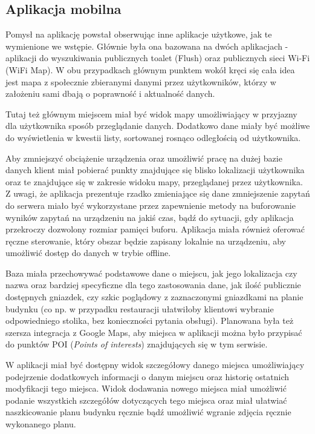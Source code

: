 \documentclass[polish,polish,a4paper,12pt]{article}
\begin{document}
	\subsection{Aplikacja mobilna}

	Pomysł na aplikację powstał obserwując inne aplikacje użytkowe, jak te wymienione we wstępie. Głównie była ona bazowana na dwóch aplikacjach - aplikacji do wyszukiwania publicznych toalet (Flush) oraz publicznych sieci Wi-Fi (WiFi Map). W obu przypadkach głównym punktem wokół kręci się cała idea jest mapa z społecznie zbieranymi danymi przez użytkowników, którzy w założeniu sami dbają o poprawność i aktualność danych.

	Tutaj też głównym miejscem miał być widok mapy umożliwiający w przyjazny dla użytkownika sposób przeglądanie danych. Dodatkowo dane miały być możliwe do wyświetlenia w kwestii listy, sortowanej rosnąco odległością od użytkownika.

	Aby zmniejszyć obciążenie urządzenia oraz umożliwić pracę na dużej bazie danych klient miał pobierać punkty znajdujące się blisko lokalizacji użytkownika oraz te znajdujące się w zakresie widoku mapy, przeglądanej przez użytkownika. Z uwagi, że aplikacja prezentuje rzadko zmieniające się dane zmniejszenie zapytań do serwera miało być wykorzystane przez zapewnienie metody na buforowanie wyników zapytań na urządzeniu na jakiś czas, bądź do sytuacji, gdy aplikacja przekroczy dozwolony rozmiar pamięci buforu. Aplikacja miała również oferować ręczne sterowanie, który obszar będzie zapisany lokalnie na urządzeniu, aby umożliwić dostęp do danych w trybie offline.

	Baza miała przechowywać podstawowe dane o miejscu, jak jego lokalizacja czy nazwa oraz bardziej specyficzne dla tego zastosowania dane, jak ilość publicznie dostępnych gniazdek, czy szkic poglądowy z zaznaczonymi gniazdkami na planie budynku (co np. w przypadku restauracji ułatwiłoby klientowi wybranie odpowiedniego stolika, bez konieczności pytania obsługi). Planowana była też szersza integracja z Google Maps, aby miejsca w aplikacji można było przypisać do punktów POI (\textit{Points of interests}) znajdujących się w tym serwisie.

	W aplikacji miał być dostępny widok szczegółowy danego miejsca umożliwiający podejrzenie dodatkowych informacji o danym miejscu oraz historię ostatnich modyfikacji tego miejsca. Widok dodawania nowego miejsca miał umożliwić podanie wszystkich szczegółów dotyczących tego miejsca oraz miał ułatwiać naszkicowanie planu budynku ręcznie bądź umożliwić wgranie zdjęcia ręcznie wykonanego planu.
\end{document}
